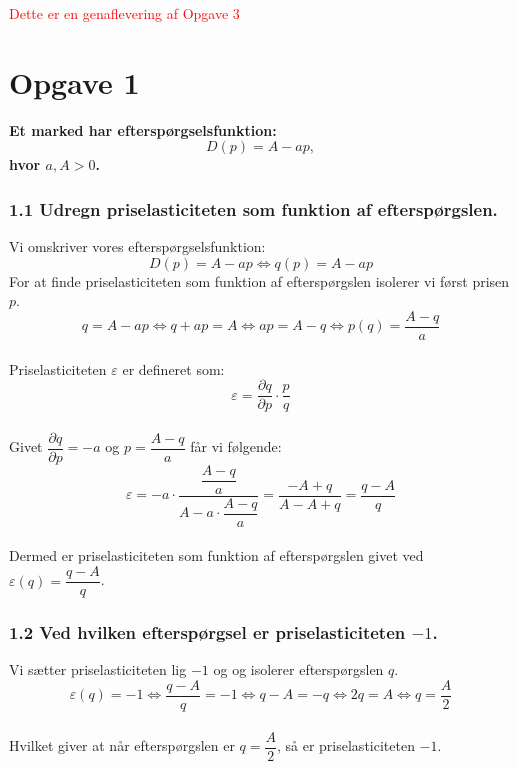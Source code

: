 \documentclass[a4paper, 12pt]{article}
\begin{document}
 

\textcolor{red}{Dette er en genaflevering af Opgave 3}

\section*{Opgave 1} 

\textbf{Et marked har efterspørgselsfunktion:}
$$D(p)=A-ap,$$
\textbf{hvor $a,A > 0$.}\\
\subsubsection*{1.1 Udregn priselasticiteten som funktion af efterspørgslen.}
Vi omskriver vores efterspørgselsfunktion:
$$D(p)=A-ap \Leftrightarrow q(p)=A-ap$$
For at  finde priselasticiteten som funktion af efterspørgslen isolerer vi først prisen $p$.
$$q=A-ap \Leftrightarrow q+ap = A \Leftrightarrow ap = A - q\Leftrightarrow p(q) = \dfrac{A - q}{a}$$
\\
Priselasticiteten $\varepsilon$ er defineret som:
$$\varepsilon = \dfrac{\partial q}{\partial p} \cdot \dfrac{p}{q}$$
\\
Givet $\dfrac{\partial q}{\partial p} = -a$ og $p = \dfrac{A - q}{a}$ får vi følgende:
$$\varepsilon = -a \cdot \dfrac{\dfrac{A-q}{a}}{A - a \cdot \dfrac{A-q}{a}} = \dfrac{-A+q}{A-A+q} = \dfrac{q - A}{q}$$
\\
Dermed er priselasticiteten som funktion af efterspørgslen givet ved $\varepsilon (q)= \dfrac{q-A}{q}$.


\subsubsection*{1.2 Ved hvilken efterspørgsel er priselasticiteten $-1$.}
Vi sætter priselasticiteten lig $-1$ og og isolerer efterspørgslen $q$.
$$\varepsilon (q)=-1 \Leftrightarrow \dfrac{q-A}{q} = -1 \Leftrightarrow q-A = -q \Leftrightarrow 2q = A \Leftrightarrow q = \dfrac{A}{2}$$\\
Hvilket giver at når efterspørgslen er $q=\dfrac{A}{2}$, så er priselasticiteten $-1$.
\end{document}
